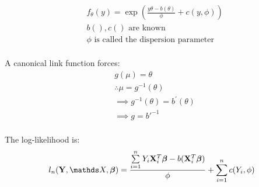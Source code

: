\newcommand{\msigma}{\Sigma}
\newcommand{\mbeta}{\mathds{B}}

\newcommand{\argmax}{\mathop{\mathrm{argmax}}}
\newcommand{\argmin}{\mathop{\mathrm{argmin}}}

\newcommand{\deq}{:=}
\newcommand{\conv}[2]{{#1 * #2}} %
\newcommand{\abs}[1]{|{#1}|}
\newcommand{\ind}[1]{\mathds{1}(#1)} %
\newcommand{\PP}{\mathrm{P}} %
\newcommand{\EE}{\mathrm{E}} %
\newcommand{\ssq}{\sigma^2}

\newcommand{\Ber}{{\rm Ber}}
\newcommand{\Bin}{{\rm Bin}}
\newcommand{\NBin}{{\rm NB}}
\newcommand{\Geom}{{\rm Geom}}
\newcommand{\Hyp}{{\rm Hyper}}
\newcommand{\Cat}{{\rm Cat}}
\newcommand{\Mult}{{\rm Mult}}
\newcommand{\Dir}{{\rm Dir}}
\newcommand{\Beta}{{\rm Beta}}
\newcommand{\Pois}{{\rm Poisson}}
\newcommand{\Unif}{{\rm Unif}}
\newcommand{\N}{{\rm N}}
\newcommand{\LN}{{\rm LN}}
\newcommand{\Exp}{{\rm Exp}}
\newcommand{\St}{{\rm St}}
\newcommand{\Chisquare}{\chi^2}
\newcommand{\Ga}{{\rm Ga}}
\newcommand{\IG}{{\rm IG}}
\newcommand{\InvGa}{{\rm IG}}




\begin {equation} \begin {split} 
& f_\theta(y) = \exp (\frac {y \theta - b(\theta)} {\phi} + c(y, \phi)) \\
& b(), c() \text { are known}  \\
&\text {$\phi$ is called the dispersion parameter} \\
\end {split} \end {equation}

A canonical link function forces:
\begin {equation} \begin {split}
& g(\mu) = \theta \\
& \therefore \mu = g^{-1}(\theta) \\
& \implies g^{-1}(\theta) =  b^{'}(\theta) \\
& \implies g = b{'}^{-1} \\
\end {split} \end {equation}

The log-likelihood is:
\begin {equation} \begin {split} 
l_n(\vY, \mX, \vbeta) = \frac { \sum \limits_{i=1}^{n} Y_i \vX_i^T \vbeta -b(\vX_i^T \vbeta) } {\phi}  + \sum \limits_{i=1}^{n} c(Y_i, \phi) \\
\end {split} \end {equation}


